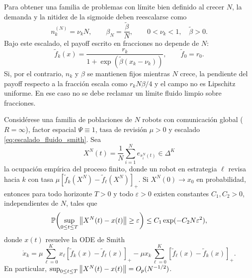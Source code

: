 Para obtener una familia de problemas con límite bien definido al crecer $N$, la demanda
y la nitidez de la sigmoide deben reescalarse como
\begin{equation}
  n_k^{(N)}=\nu_kN,
  \qquad
  \beta_N=\frac{\tilde\beta}{N},
  \qquad
  0<\nu_k<1,\quad \tilde\beta>0.
  \label{eq:escalado_fluido_smith}
\end{equation}
Bajo este escalado, el payoff escrito en fracciones no depende de $N$:
\begin{equation}
  \tilde f_k(x)
  =
  \frac{r_k}{1+\exp\!\left(\tilde\beta(x_k-\nu_k)\right)},
  \qquad
  \tilde f_0=r_0.
  \label{eq:payoff_fluido_smith}
\end{equation}
Si, por el contrario, $n_k$ y $\beta$ se mantienen fijos mientras $N$ crece, la pendiente
del payoff respecto a la fracción escala como $r_kN\beta/4$ y el campo no es Lipschitz
uniforme. En ese caso no se debe reclamar un límite fluido limpio sobre fracciones.

\begin{teorema}
\label{teo:aproximacion_determinista_smith}
Considérese una familia de poblaciones de $N$ robots con comunicación global
($R=\infty$), factor espacial $\Psi\equiv1$, tasa de revisión $\mu>0$ y escalado
\eqref{eq:escalado_fluido_smith}. Sea
\begin{equation}
  X^N(t)
  =
  \frac{1}{N}\sum_{i=1}^{N} e_{s_i^N(t)}
  \in\Delta^K
  \label{eq:ocupacion_empirica_smith}
\end{equation}
la ocupación empírica del proceso finito, donde un robot en estrategia $\ell$ revisa hacia
$k$ con tasa $\mu[\tilde f_k(X^N)-\tilde f_\ell(X^N)]_+$. Si
$X^N(0)\to x_0$ en probabilidad, entonces para todo horizonte $T>0$ y todo
$\varepsilon>0$ existen constantes $C_1,C_2>0$, independientes de $N$, tales que
\begin{equation}
  \mathbb P\!\left(
  \sup_{0\le t\le T}\left\|X^N(t)-x(t)\right\|\ge\varepsilon
  \right)
  \le
  C_1\exp(-C_2N\varepsilon^2),
  \label{eq:cota_aproximacion_determinista}
\end{equation}
donde $x(t)$ resuelve la ODE de Smith
\begin{equation}
  \dot x_k
  =
  \mu\sum_{\ell=0}^{K}x_\ell[\tilde f_k(x)-\tilde f_\ell(x)]_+
  -
  \mu x_k\sum_{\ell=0}^{K}[\tilde f_\ell(x)-\tilde f_k(x)]_+ .
  \label{eq:ode_smith_fluida}
\end{equation}
En particular,
$\sup_{0\le t\le T}\left\|X^N(t)-x(t)\right\|=O_p(N^{-1/2})$.
\end{teorema}

